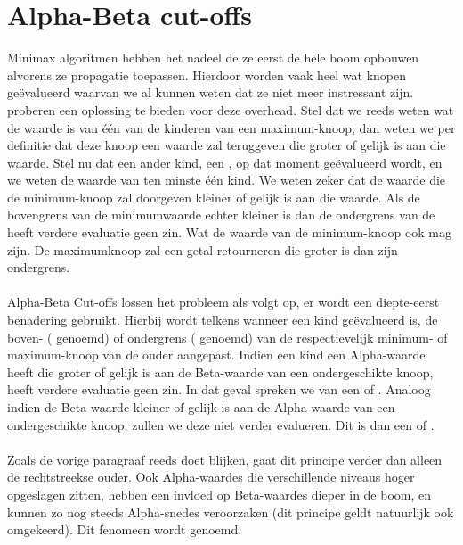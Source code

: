 \section{Alpha-Beta cut-offs}
Minimax algoritmen hebben het nadeel de ze eerst de hele boom opbouwen alvorens ze propagatie toepassen. Hierdoor worden vaak heel wat knopen ge\"evalueerd waarvan we al kunnen weten dat ze niet meer instressant zijn.  proberen een oplossing te bieden voor deze overhead. Stel dat we reeds weten wat de waarde is van \'e\'en van de kinderen van een maximum-knoop, dan weten we per definitie dat deze knoop een waarde zal teruggeven die groter of gelijk is aan die waarde. Stel nu dat een ander kind, een , op dat moment ge\"evalueerd wordt, en we weten de waarde van ten minste \'e\'en kind. We weten zeker dat de waarde die de minimum-knoop zal doorgeven kleiner of gelijk is aan die waarde. Als de bovengrens van de minimumwaarde echter kleiner is dan de ondergrens van de  heeft verdere evaluatie geen zin. Wat de waarde van de minimum-knoop ook mag zijn. De maximumknoop zal een getal retourneren die groter is dan zijn ondergrens.
\paragraph{}
Alpha-Beta Cut-offs lossen het probleem als volgt op, er wordt een diepte-eerst benadering gebruikt. Hierbij wordt telkens wanneer een kind ge\"evalueerd is, de boven- ( genoemd) of ondergrens ( genoemd) van de respectievelijk minimum- of maximum-knoop van de ouder aangepast. Indien een kind een Alpha-waarde heeft die groter of gelijk is aan de Beta-waarde van een ondergeschikte knoop, heeft verdere evaluatie geen zin. In dat geval spreken we van een  of . Analoog indien de Beta-waarde kleiner of gelijk is aan de Alpha-waarde van een ondergeschikte knoop, zullen we deze niet verder evalueren. Dit is dan een  of .
\paragraph{}
Zoals de vorige paragraaf reeds doet blijken, gaat dit principe verder dan alleen de rechtstreekse ouder. Ook Alpha-waardes die verschillende niveaus hoger opgeslagen zitten, hebben een invloed op Beta-waardes dieper in de boom, en kunnen zo nog steeds Alpha-snedes veroorzaken (dit principe geldt natuurlijk ook omgekeerd). Dit fenomeen wordt  genoemd.
